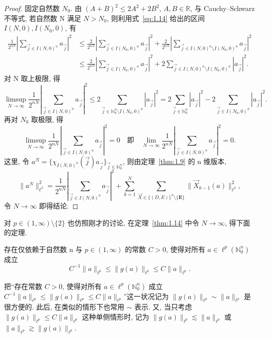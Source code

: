 \begin{proof}
固定自然数 $N_{0}$. 由 $(A+B)^{2} \leq 2A^{2} + 2B^{2}$, $A, B \in \mathbb{R}$, 与 Cauchy--Schwarz 不等式, 若自然数 N 满足 $N > N_{0}$, 则利用式~\eqref{eq:1.14} 给出的区间 $I(N,0), I(N_{0},0)$, 有
\begin{align*}
\frac{1}{2^{nN}}\left|\sum_{\vec{j}\in I(N,0)^{n}}a_{\vec{j}}\right|^{2}
&\leq \frac{2}{2^{nN}}\left|\sum_{\vec{j}\in I(N_{0},0)^{n}}a_{\vec{j}}\right|^{2} + \frac{2}{2^{nN}}\left|\sum_{\vec{j}\in I(N,0)^{n}\setminus I(N_{0},0)^{n}}a_{\vec{j}}\right|^{2} \\
&\leq \frac{2}{2^{nN}}\left|\sum_{\vec{j}\in I(N_{0},0)^{n}}a_{\vec{j}}\right|^{2} + 2\sum_{\vec{j}\in I(N,0)^{n}\setminus I(N_{0},0)^{n}}|a_{\vec{j}}|^{2}.
\end{align*}
对 N 取上极限, 得
\[
\limsup_{N\to\infty}\frac{1}{2^{nN}}\left|\sum_{\vec{j}\in I(N,0)^{n}}a_{\vec{j}}\right|^{2} \leq 2\sum_{\vec{j}\in\mathbb{N}_{0}^{n}\setminus I(N_{0},0)^{n}}|a_{\vec{j}}|^{2} = 2\sum_{\vec{j}\in\mathbb{N}_{0}^{n}}|a_{\vec{j}}|^{2} - 2\sum_{\vec{j}\in I(N_{0},0)^{n}}|a_{\vec{j}}|^{2}.
\]
再对 $N_{0}$ 取极限, 得
\[
\limsup_{N\to\infty}\frac{1}{2^{nN}}\left|\sum_{\vec{j}\in I(N,0)^{n}}a_{\vec{j}}\right|^{2} = 0 \quad \text{即} \quad \lim_{N\to\infty}\frac{1}{2^{nN}}\left|\sum_{\vec{j}\in I(N,0)^{n}}a_{\vec{j}}\right|^{2} = 0.
\]
这里, 令 $a^{N} = \{\chi_{I(N,0)^{n}}(\vec{j})a_{\vec{j}}\}_{\vec{j}\in\mathbb{N}_{0}^{n}}$, 则由定理~\ref{thm:1.9} 的 n 维版本,
\[
\|a^{N}\|_{\ell^{2}}^{2} = \frac{1}{2^{nN}}\left|\sum_{\vec{j}\in I(N,0)^{n}}a_{\vec{j}}\right|^{2} + \sum_{k=1}^{N}\sum_{\vec{X}\in\{(D,E)\}^{n}\setminus\{\mathbf{E}\}}\|\vec{X}_{k-1}(a)\|_{\ell^{2}}^{2},
\]
令 $N \to \infty$ 即得结论.
\end{proof}

对 $p \in (1, \infty)\setminus\{2\}$ 也仿照刚才的讨论, 在定理~\ref{thm:1.14} 中令 $N \to \infty$, 得下面的定理.

\begin{theorem}\label{thm:1.15}
存在仅依赖于自然数 n 与 $p \in (1, \infty)$ 的常数 $C > 0$, 使得对所有 $a \in \ell^{p}(\mathbb{N}_{0}^{n})$ 成立
\[
C^{-1}\|a\|_{\ell^{p}} \leq \|g(a)\|_{\ell^{p}} \leq C\|a\|_{\ell^{p}}.
\]
\end{theorem}

把``存在常数 $C > 0$, 使得对所有 $a \in \ell^{p}(\mathbb{N}_{0}^{n})$ 成立 $C^{-1}\|a\|_{\ell^{p}} \leq \|g(a)\|_{\ell^{p}} \leq C\|a\|_{\ell^{p}}$''这一状况记为 $\|g(a)\|_{\ell^{p}} \sim \|a\|_{\ell^{p}}$ 是很方便的. 此后, 在类似的情形下也常用 $\sim$ 表示. 又, 当只考虑 $\|g(a)\|_{\ell^{p}} \leq C\|a\|_{\ell^{p}}$ 这种单侧情形时, 记为 $\|g(a)\|_{\ell^{p}} \lesssim \|a\|_{\ell^{p}}$ 或 $\|a\|_{\ell^{p}} \gtrsim \|g(a)\|_{\ell^{p}}$.

